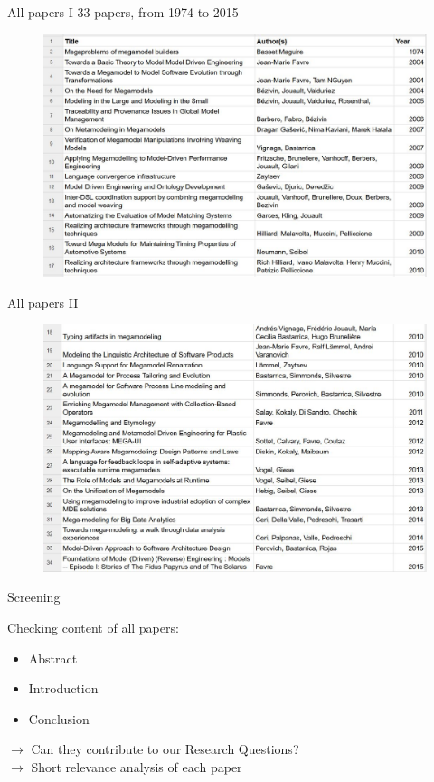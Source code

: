 \documentclass{beamer}
\begin{document}
\begin{frame}{All papers I}
33 papers, from 1974 to 2015
\begin{figure}
	\includegraphics[width=1.0\textwidth]{all_papers_1}
\end{figure}
\end{frame}

\begin{frame}{All papers II}
\begin{figure}
	\includegraphics[width=1.0\textwidth]{all_papers_2}
\end{figure}
\end{frame}

\begin{frame}{Screening}
\begin{block}{Checking content of all papers:}
\begin{itemize}
	\item Abstract
	\item Introduction
	\item Conclusion
\end{itemize}
\end{block}
\vspace{1cm}
\large{$\rightarrow$ Can they contribute to our Research} Questions?\\
\large{$\rightarrow$ Short relevance analysis of each paper}
\end{frame}
\end{document}
